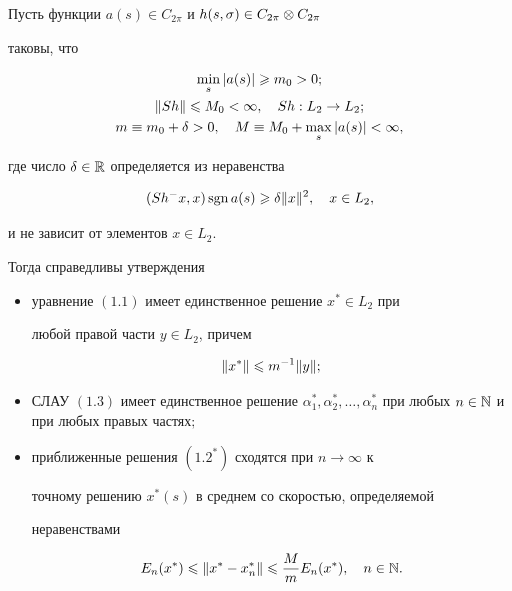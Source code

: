 \begin{thm}


Пусть функции $a(s)\in C_{2\pi}$ и $h(s,\sigma)\in C_{2\pi}\otimes C_{2\pi}$


таковы, что


\begin{gather}


\min\limits_s |a(s)|\gea m_0 > 0; \\


%


\|Sh\|\lea M_0 < \infty, \quad Sh:L_2\to L_2; \\


%


m \equiv m_0+\delta >0,\quad


M \equiv M_0+\max\limits_s|a(s)|<\infty,


\end{gather}


где число $\delta \in \Bbb R$ определяется из неравенства


\begin{equation}


(Sh^-x,x)\sgn a(s)\gea \delta \|x\|^2,\quad x\in L_2,


\end{equation}


и не зависит от элементов $x\in L_2$.





Тогда справедливы утверждения


\begin{itemize}


\item[$\alpha)$] уравнение $(1.1)$ имеет единственное решение $x^*\in L_2$ при


любой правой части $y\in L_2$, причем


\begin{equation}


\|x^*\|\lea m^{-1}\|y\|;


\end{equation}


\item[$\beta$)] СЛАУ $(1.3)$ имеет единственное решение $\alpha_1^*,\alpha_2^*,


\dotsc, \alpha_n^*$ при любых $n\in \N$ и при любых правых частях$;$


\item[$\gamma$)] приближенные решения $(1.2^*)$ сходятся при $n\to \infty$ к


точному решению $x^*(s)$ в среднем со скоростью, определяемой


неравенствами


\begin{equation}


E_n(x^*)\lea \|x^*-x_n^*\|\lea \frac{M}{m}E_n(x^*),\quad n\in \N.


\end{equation}


\end{itemize}


\end{thm}









